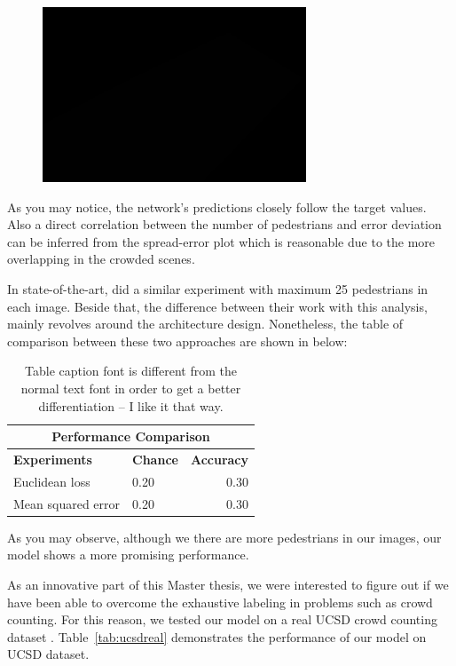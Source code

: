 \begin{figure}[H]
	\centering
	{\includegraphics[width=0.7\textwidth]{images/1}}
	\caption{}
	\label{fig:splot}
\end{figure}

As you may notice, the network's predictions closely follow the target values. Also a direct correlation between the number of pedestrians and error deviation can be inferred from the spread-error plot which is reasonable due to the more overlapping in the crowded scenes. 

\noindent In state-of-the-art, \citeauthor*{segui2015learning} did a similar experiment with maximum 25 pedestrians in each image. Beside that, the difference between their work with this analysis, mainly revolves around the architecture design. Nonetheless, the table of comparison between these two approaches are shown in below:
 
\begin{table}[H]
\centering
\small\sffamily
\begin{tabular}{llr}
\multicolumn{3}{c}{\textbf{\textbf{Performance Comparison}}} \\
\bottomrule
\textbf{Experiments}  & \textbf{Chance} & \textbf{Accuracy} \\
\bottomrule
Euclidean loss           & 0.20 & 0.30 \\
Mean squared error       & 0.20 & 0.30 \\
\bottomrule
\end{tabular}
\caption{Table caption font is different from the normal text font in order to get a better differentiation -- I like it that way.}
\label{tab:}
\end{table} 

As you may observe, although we there are more pedestrians in our images, our model shows a more promising performance. 

\noindent As an innovative part of this Master thesis, we were interested to figure out if we have been able to overcome the exhaustive labeling in problems such as crowd counting. For this reason, we tested our model on a real UCSD crowd counting dataset \cite{chan2008privacy}. Table~\ref{tab:ucsdreal} demonstrates the performance of our model on UCSD dataset.


